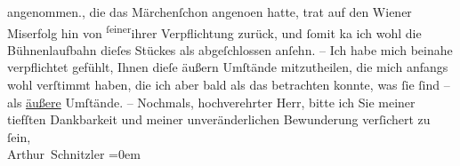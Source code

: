 \begin{ledgroupsized}[t]{13cm}
{{{                  angenommen.}}}\label{K_L00336_3h}, die das Märchenſchon angeno{\geminationm}en hatte,
               trat auf den Wiener Miserfolg hin von \substVorne{}\textsuperscript{ſeiner}{\allowbreak}\substDazwischen{}ihrer\substHinten{} Verpflichtung zurück, und ſomit ka{\geminationn} ich wohl
               die Bühnenlaufbahn dieſes Stückes als abgeſchlossen anſehn. – Ich {\pb}habe mich beinahe verpflichtet gefühlt, Ihnen
               dieſe äußern Umſtände mitzutheilen, die mich anfangs wohl verſtimmt haben, die ich
               aber bald als das betrachten konnte, was ſie ſind – als \uline{äußere} Umſtände. –\pend
           \pstart
           Nochmals, hochverehrter Herr, bitte ich Sie meiner tiefſten Dankbarkeit und
               meiner unveränderlichen Bewunderung verſichert zu ſein,{\\[\baselineskip]}\spacefill\mbox{Arthur Schnitzler}\pend
           \leftskip=0em{}
         
         \endnumbering{}\end{ledgroupsized}  \newcommand{\dateiname}{L00336}\newcommand{\titel}{Arthur Schnitzler an Georg Brandes, 12. 6. 1894}\newcommand{\editorInnen}{Martin Anton Müller und Gerd-Hermann Susen}
      
